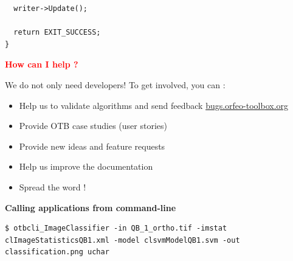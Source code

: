 \documentclass[portrait,a0]{a0poster}
\newenvironment{poster}{
  \begin{center}
  \begin{minipage}[c]{0.99\textwidth}
}{
  \end{minipage} 
  \end{center}
}
\newcommand{\titresubsection}[1]{ 
 	\begin{center}
 	\Large{\textbf{#1}}
 	\end{center}
 }
\begin{document}
\begin{poster}
\begin{minipage}[t]{\textwidth}
\begin{minipage}[t]{0.33\textwidth}
\begin{minipage}[t]{\textwidth}
\begin{lstlisting}
  writer->Update();

  return EXIT_SUCCESS;
}
\end{lstlisting}
\end{minipage}
\vspace{1cm}
\begin{minipage}[t]{\textwidth}
\titresubsection{\textcolor{red}{How can I help ?}}
\Large{
We do not only need developers! To get involved, you can :
\begin{itemize}
\item Help us to validate algorithms and send feedback \url{bugs.orfeo-toolbox.org}
\item Provide OTB case studies (user stories)
\item Provide new ideas and feature requests
\item Help us improve the documentation
\item Spread the word !
\end{itemize}
}
\end{minipage}
\end{minipage}
\hfill
\begin{minipage}[t]{0.33\textwidth}
\begin{minipage}[t]{\textwidth}
\titresubsection{Calling applications from command-line}
\begin{lstlisting}[language=ksh,breaklines=true,breakatwhitespace=true,frame = tb,framerule = 0.25pt,fontadjust,backgroundcolor={\color{listlightgray}},basicstyle = {\ttfamily\small},keywordstyle = {\ttfamily\color{listkeyword}\textbf},identifierstyle = {\ttfamily},commentstyle = {\ttfamily\color{listcomment}\textit},stringstyle = {\ttfamily},showstringspaces = false,showtabs = false,numbers = none,numbersep = 6pt, numberstyle={\ttfamily\color{listnumbers}},tabsize = 2]
$ otbcli_ImageClassifier -in QB_1_ortho.tif -imstat clImageStatisticsQB1.xml -model clsvmModelQB1.svm -out classification.png uchar
\end{lstlisting}
\end{minipage}

\vspace{1.5cm}


\end{minipage}
\end{minipage}
\end{poster}
\end{document}

